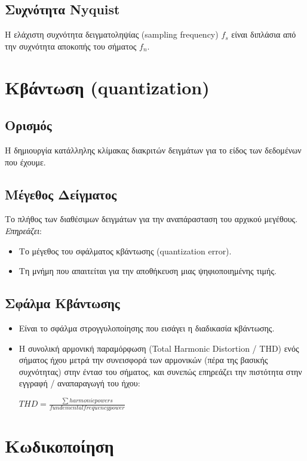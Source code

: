 \documentclass[a4paper,12pt]{article}
\begin{document}
\subsection{Συχνότητα Nyquist}
Η ελάχιστη συχνότητα δειγματοληψίας (sampling frequency) $f_{s}$
είναι διπλάσια από την συχνότητα αποκοπής του σήματος $f_{n}$.

\newpage\section{Κβάντωση (quantization)}
\subsection{Ορισμός}
Η δημιουργία κατάλληλης κλίμακας διακριτών δειγμάτων για το
είδος των δεδομένων που έχουμε.
\subsection{Μέγεθος Δείγματος}
Το πλήθος των διαθέσιμων δειγμάτων για την αναπάρασταση του
αρχικού μεγέθους. \textit{Επηρεάζει}:
\begin{itemize}
    \item Το μέγεθος του σφάλματος κβάντωσης (quantization error).
    \item Τη μνήμη που απαιτείται για την αποθήκευση μιας
          ψηφιοποιημένης τιμής.
\end{itemize}
\subsection{Σφάλμα Κβάντωσης}
\begin{itemize}
    \item Είναι το σφάλμα στρογγυλοποίησης που εισάγει η διαδικασία κβάντωσης.
    \item Η συνολική αρμονική παραμόρφωση (Total Harmonic Distortion / THD) ενός
          σήματος ήχου μετρά την συνεισφορά των αρμονικών (πέρα της βασικής συχνότητας)
          στην έντασ του σήματος, και συνεπώς επηρεάζει την πιστότητα στην εγγραφή /
          αναπαραγωγή του ήχου:\\
          \begin{center}
              $THD = \frac{\sum harmonic powers}{fundemental frequency power}$
          \end{center}
\end{itemize}


\newpage\section{Κωδικοποίηση}
\end{document}
